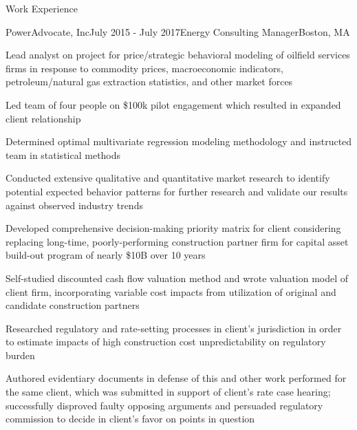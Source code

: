 \documentclass{resume} %
\begin{document}

\begin{rSection}{Work Experience}

\begin{rSubsection}{PowerAdvocate, Inc}{July 2015 - July 2017}{Energy Consulting Manager}{Boston, MA}
\item Lead analyst on project for price/strategic behavioral modeling of oilfield services firms in response to commodity prices, macroeconomic indicators, petroleum/natural gas extraction statistics, and other market forces
\begin{list}{}
\item Led team of four people on \$100k pilot engagement which resulted in expanded client relationship
\item Determined optimal multivariate regression modeling methodology and instructed team in statistical methods
\item Conducted extensive qualitative and quantitative market research to identify potential expected behavior patterns for further research and validate our results against observed industry trends
\end{list}
\item Developed comprehensive decision-making priority matrix for client considering replacing long-time, poorly-performing construction partner firm for capital asset build-out program of nearly \$10B over 10 years
\begin{list}{}
\item Self-studied discounted cash flow valuation method and wrote valuation model of client firm, incorporating variable cost impacts from utilization of original and candidate construction partners
\item Researched regulatory and rate-setting processes in client's jurisdiction in order to estimate impacts of high construction cost unpredictability on regulatory burden
\item Authored evidentiary documents in defense of this and other work performed for the same client, which was submitted in support of client's rate case hearing; successfully disproved faulty opposing arguments and persuaded regulatory commission to decide in client's favor on points in question
\end{list}
\end{rSubsection}


\end{rSection}
\end{document}
